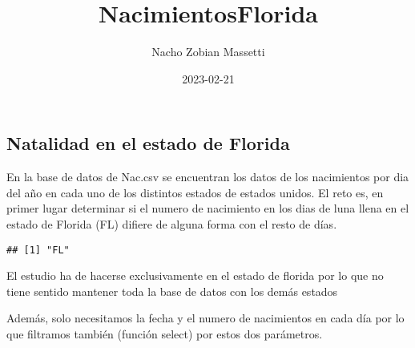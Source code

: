\documentclass[
]{article}
\title{NacimientosFlorida}
\author{Nacho Zobian Massetti}
\date{2023-02-21}
\newenvironment{Shaded}{\begin{snugshade}}{\end{snugshade}}
\newcommand{\AttributeTok}[1]{\textcolor[rgb]{0.77,0.63,0.00}{#1}}
\newcommand{\CommentTok}[1]{\textcolor[rgb]{0.56,0.35,0.01}{\textit{#1}}}
\newcommand{\ConstantTok}[1]{\textcolor[rgb]{0.00,0.00,0.00}{#1}}
\newcommand{\DecValTok}[1]{\textcolor[rgb]{0.00,0.00,0.81}{#1}}
\newcommand{\FunctionTok}[1]{\textcolor[rgb]{0.00,0.00,0.00}{#1}}
\newcommand{\NormalTok}[1]{#1}
\newcommand{\OtherTok}[1]{\textcolor[rgb]{0.56,0.35,0.01}{#1}}
\newcommand{\SpecialCharTok}[1]{\textcolor[rgb]{0.00,0.00,0.00}{#1}}
\newcommand{\StringTok}[1]{\textcolor[rgb]{0.31,0.60,0.02}{#1}}
\begin{document}
\maketitle

\hypertarget{natalidad-en-el-estado-de-florida}{%
\subsection{Natalidad en el estado de
Florida}\label{natalidad-en-el-estado-de-florida}}

En la base de datos de Nac.csv se encuentran los datos de los
nacimientos por dia del año en cada uno de los distintos estados de
estados unidos. El reto es, en primer lugar determinar si el numero de
nacimiento en los dias de luna llena en el estado de Florida (FL)
difiere de alguna forma con el resto de días.

\begin{Shaded}
\end{Shaded}

\begin{verbatim}
## [1] "FL"
\end{verbatim}

El estudio ha de hacerse exclusivamente en el estado de florida por lo
que no tiene sentido mantener toda la base de datos con los demás
estados

Además, solo necesitamos la fecha y el numero de nacimientos en cada día
por lo que filtramos también (función select) por estos dos parámetros.
\end{document}
